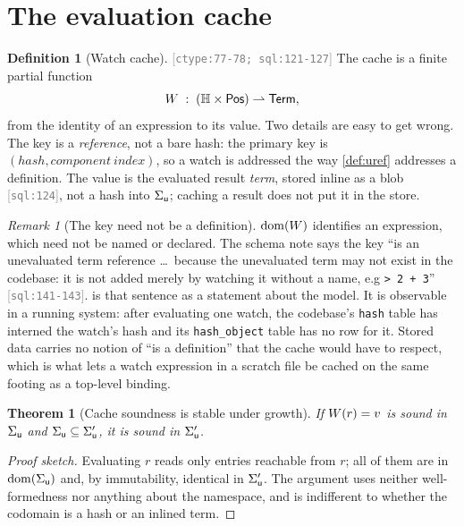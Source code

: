 \documentclass[11pt]{article}
\theoremstyle{definition}
\newtheorem{definition}{Definition}[section]
\theoremstyle{plain}
\newtheorem{theorem}{Theorem}[section]
\theoremstyle{remark}
\newtheorem{remark}{Remark}[section]
\newcommand{\src}[1]{{\footnotesize\textcolor{gray}{[\texttt{#1}]}}}
\begin{document}
\section{The evaluation cache}\label{sec:ucache}

\begin{definition}[Watch cache]\label{def:watch}
\src{ctype:77-78; sql:121-127} The cache is a finite partial function
\[
  W \;:\; (\mathbb{H} \times \mathsf{Pos}) \rightharpoonup \mathsf{Term} ,
\]
from the identity of an expression to its value. Two details are easy to get wrong. The key is a
\emph{reference}, not a bare hash: the primary key is $(\mathit{hash}, \mathit{component\ index})$, so
a watch is addressed the way \cref{def:uref} addresses a definition. The value is the evaluated result
\emph{term}, stored inline as a blob \src{sql:124}, not a hash into $\Sigma_{\mathsf{u}}$; caching a result does
not put it in the store.
\end{definition}

\begin{remark}[The key need not be a definition]\label{rem:watchkey}
$\operatorname{dom}(W)$ identifies an expression, which need not be named or declared. The schema note says
the key ``is an unevaluated term reference \dots\ because the unevaluated term may not exist in the
codebase: it is not added merely by watching it without a name, e.g \texttt{> 2 + 3}''
\src{sql:141-143}.  is that sentence as a statement about the model. It is
observable in a running system: after evaluating one watch, the codebase's \texttt{hash} table has
interned the watch's hash and its \texttt{hash\_object} table has no row for it. Stored data carries
no notion of ``is a definition'' that the cache would have to respect, which is what lets a watch
expression in a scratch file be cached on the same footing as a top-level binding.
\end{remark}

\begin{theorem}[Cache soundness is stable under growth]\label{thm:wstable}
If $W(r) = v$ is sound in $\Sigma_{\mathsf{u}}$ and $\Sigma_{\mathsf{u}} \subseteq \Sigma_{\mathsf{u}}'$, it is sound in
$\Sigma_{\mathsf{u}}'$.
\end{theorem}
\begin{proof}[Proof sketch]
Evaluating $r$ reads only entries reachable from $r$; all of them are in $\operatorname{dom}(\Sigma_{\mathsf{u}})$ and, by
immutability, identical in $\Sigma_{\mathsf{u}}'$. The argument uses neither well-formedness nor anything about
the namespace, and is indifferent to whether the codomain is a hash or an inlined term.
\end{proof}
\end{document}
